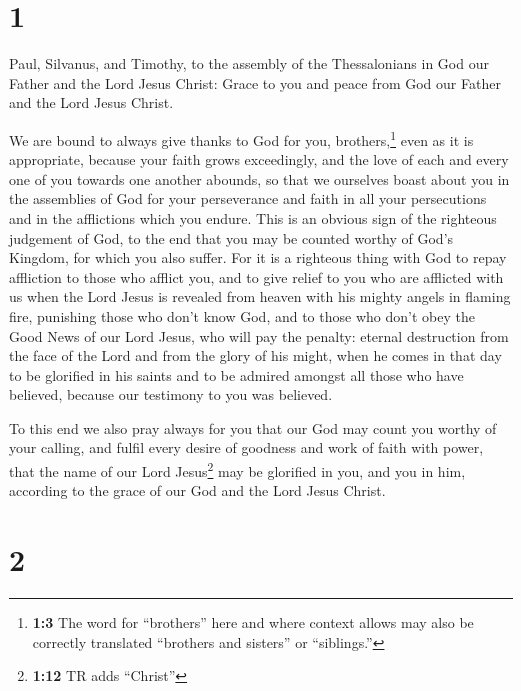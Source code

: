 \hypertarget{section}{%
\section{1}\label{section}}

 Paul, Silvanus, and Timothy, to the assembly of the
Thessalonians in God our Father and the Lord Jesus Christ:
 Grace to you and peace from God our Father and the Lord
Jesus Christ.

 We are bound to always give thanks to God for you,
brothers,\footnote{\textbf{1:3} The word for ``brothers'' here and where
  context allows may also be correctly translated ``brothers and
  sisters'' or ``siblings.''} even as it is appropriate, because your
faith grows exceedingly, and the love of each and every one of you
towards one another abounds,  so that we ourselves boast
about you in the assemblies of God for your perseverance and faith in
all your persecutions and in the afflictions which you endure.
 This is an obvious sign of the righteous judgement of
God, to the end that you may be counted worthy of God's Kingdom, for
which you also suffer.  For it is a righteous thing with
God to repay affliction to those who afflict you,  and to
give relief to you who are afflicted with us when the Lord Jesus is
revealed from heaven with his mighty angels in flaming fire,
 punishing those who don't know God, and to those who
don't obey the Good News of our Lord Jesus,  who will pay
the penalty: eternal destruction from the face of the Lord and from the
glory of his might,  when he comes in that day to be
glorified in his saints and to be admired amongst all those who have
believed, because our testimony to you was believed.

 To this end we also pray always for you that our God may
count you worthy of your calling, and fulfil every desire of goodness
and work of faith with power,  that the name of our Lord
Jesus\footnote{\textbf{1:12} TR adds ``Christ''} may be glorified in
you, and you in him, according to the grace of our God and the Lord
Jesus Christ.

\hypertarget{section-1}{%
\section{2}\label{section-1}}


